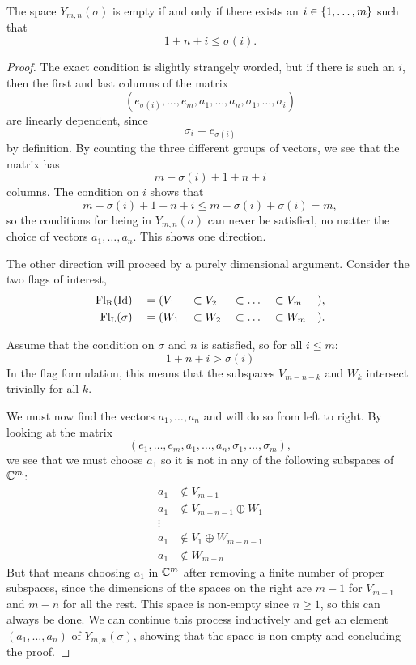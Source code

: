 \begin{theorem}
  \label{thm:ikke-tom}
  The space $Y_{m,n}(\sigma)$ is empty if and only if there exists an
  $i \in \left\{ 1,\dots,m \right\}$ such that
  \[ 1 + n + i \leq \sigma(i). \]
\end{theorem}
\begin{proof}
  The exact condition is slightly strangely worded, but if there is
  such an $i$, then the first and last columns of the matrix
  \[ (e_{\sigma(i)},\dots,e_m,a_1,\dots,a_n,\sigma_1,\dots,\sigma_i) \]
  are linearly dependent, since
  \[ \sigma_i = e_{\sigma(i)} \]
  by definition. By counting the three different groups of vectors, we
  see that the matrix has
  \[ m - \sigma(i) + 1 + n + i \]
  columns. The condition on $i$ shows that
  \[ m - \sigma(i) + 1 + n + i \leq m - \sigma(i) + \sigma(i) = m, \]
  so the conditions for being in $Y_{m,n}(\sigma)$ can never be
  satisfied, no matter the choice of vectors $a_1,\dots,a_n$. This
  shows one direction.

  The other direction
  will proceed by a purely dimensional argument. Consider the two
  flags of interest,
  \begin{alignat*}{6}
    \mathrm{Fl_R}(\operatorname{Id}) &&\;= (&V_1 &&\subset V_2 &&\subset \dots
    &&\subset V_m&&), \\
    \mathrm{Fl_L}(\sigma) &&\;= (&W_1 &&\subset W_2 &&\subset \dots &&\subset
                            W_m&&).
  \end{alignat*}

  Assume that the condition on $\sigma$ and $n$ is satisfied, so for
  all $i \leq m$:
  \[ 1 + n + i > \sigma(i) \]
  In the flag formulation, this means that the subspaces $V_{m-n-k}$
  and $W_k$ intersect trivially for all $k$.

  We must now find the vectors $a_1,\dots,a_n$ and will do so from
  left to right. By looking at the matrix
  \[ \left( e_1, \dots, e_m, a_1, \dots, a_n, \sigma_1, \dots,
    \sigma_m \right), \]
  we see that we must choose $a_1$ so it is not in any of the
  following subspaces of $\mathbb{C}^m$:
  \begin{align*}
    a_1 &\not\in V_{m-1} \\
    a_1 &\not\in V_{m-n-1} \oplus W_1 \\
    \vdots & \\
    a_1 &\not\in V_1\oplus W_{m-n-1} \\
    a_1 &\not\in W_{m-n}
  \end{align*}
  But that means choosing $a_1$ in $\mathbb{C}^m$ after removing a
  finite number of proper subspaces, since the dimensions of the
  spaces on the right are $m-1$ for $V_{m-1}$ and $m-n$ for
  all the rest. This space is non-empty since $n\geq 1$, so this can
  always be done. We can continue this process inductively and get an
  element $(a_1,\dots,a_n)$ of $Y_{m,n}(\sigma)$, showing that the
  space is non-empty and concluding the proof.
\end{proof}
